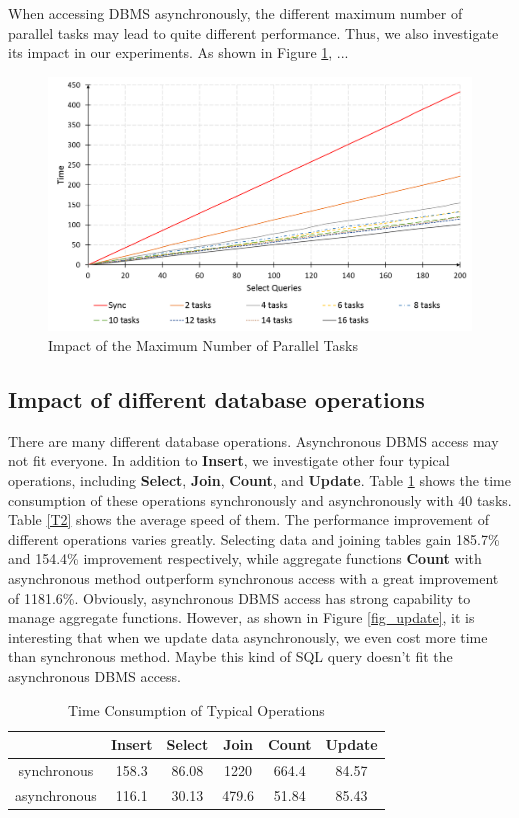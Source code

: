 \documentclass[onecolumn, conference, 12pt]{IEEEtran}
\begin{document}
	When accessing DBMS asynchronously, the different maximum number of parallel tasks may lead to quite different performance. Thus, we also investigate its impact in our experiments. As shown in Figure \ref{fig_select}, ...	
	\begin{figure}[!t]
		\centering
		\includegraphics[width=6.5in]{fig/select.png}
		\caption{Impact of the Maximum Number of Parallel Tasks}
		\label{fig_select}
	\end{figure}
	
	\subsection{Impact of different database operations}
	
	There are many different database operations. Asynchronous DBMS access may not fit everyone. In addition to \textbf{Insert}, we investigate other four typical operations, including \textbf{Select}, \textbf{Join}, \textbf{Count}, and \textbf{Update}. Table \ref{T1} shows the time consumption of these operations synchronously and asynchronously with 40 tasks. Table \ref{T2} shows the average speed of them. The performance improvement of different operations varies greatly. Selecting data and joining tables gain 185.7\% and 154.4\% improvement respectively, while aggregate functions \textbf{Count} with asynchronous method outperform synchronous access with a great improvement of 1181.6\%. Obviously, asynchronous DBMS access has strong capability to manage aggregate functions. However, as shown in Figure \ref{fig_update}, it is interesting that when we update data asynchronously, we even cost more time than synchronous method. Maybe this kind of SQL query doesn’t fit the asynchronous DBMS access.
	
	\begin{table}
		\centering
		\caption{Time Consumption of Typical Operations}
		\begin{tabular}{|c|c|c|c|c|c|}
			\hline
			& Insert & Select & Join & Count & Update\\
			\hline
			synchronous & 158.3 & 86.08 & 1220 & 664.4 & 84.57\\
			\hline
			asynchronous & 116.1 & 30.13 & 479.6 & 51.84 & 85.43\\
			\hline
		\end{tabular}
		\label{T1}
	\end{table}
	
\end{document}
